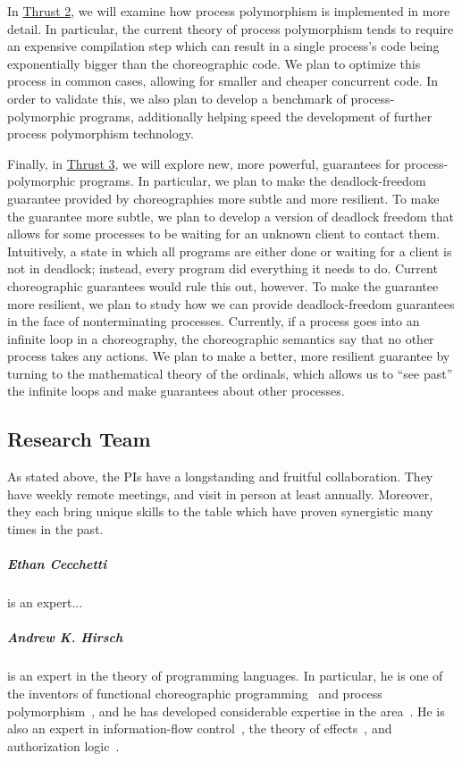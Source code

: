 In \hyperref[sec:t2]{Thrust 2}, we will examine how process polymorphism is implemented in more detail.
In particular, the current theory of process polymorphism tends to require an expensive compilation step which can result in a single process's code being exponentially bigger than the choreographic code.
We plan to optimize this process in common cases, allowing for smaller and cheaper concurrent code.
In order to validate this, we also plan to develop a benchmark of process-polymorphic programs, additionally helping speed the development of further process polymorphism technology.

Finally, in \hyperref[sec:t3]{Thrust 3}, we will explore new, more powerful, guarantees for process-polymorphic programs.
In particular, we plan to make the deadlock-freedom guarantee provided by choreographies more subtle and more resilient.
To make the guarantee more subtle, we plan to develop a version of deadlock freedom that allows for some processes to be waiting for an unknown client to contact them.
Intuitively, a state in which all programs are either done or waiting for a client is not in deadlock; instead, every program did everything it needs to do.
Current choreographic guarantees would rule this out, however.
To make the guarantee more resilient, we plan to study how we can provide deadlock-freedom guarantees in the face of nonterminating processes.
Currently, if a process goes into an infinite loop in a choreography, the choreographic semantics say that no other process takes any actions.
We plan to make a better, more resilient guarantee by turning to the mathematical theory of the ordinals, which allows us to ``see past'' the infinite loops and make guarantees about other processes.

\subsection{Research Team}

As stated above, the PIs have a longstanding and fruitful collaboration.
They have weekly remote meetings, and visit in person at least annually.
Moreover, they each bring unique skills to the table which have proven synergistic many times in the past.

\subparagraph{Ethan Cecchetti} is an expert...

\subparagraph{Andrew K. Hirsch} is an expert in the theory of programming languages.
In particular, he is one of the inventors of functional choreographic programming~\cite{HirschG22} and process polymorphism~\cite{GraversenHM24}, and he has developed considerable expertise in the area~\cite{SamuelsonHC25,GraversenHM24,HirschG22,BohosianH25}.
He is also an expert in information-flow control~\cite{SilverHCHZ23,MenzHLG23,HirschC21,HirschACAT20}, the theory of effects~\cite{SilverHCHZ23,HirschC21,HirschT18}, and authorization logic~\cite{HirschACAT20,HirschC13}.

